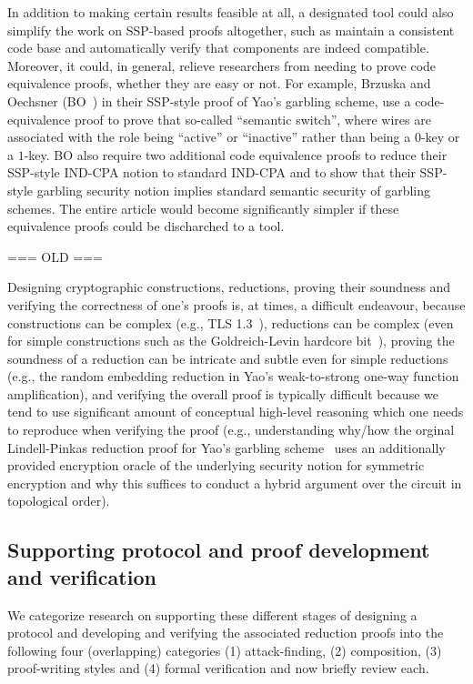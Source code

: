 {In addition to making certain results feasible at all, a designated tool could 
also simplify the work on SSP-based proofs altogether, such as maintain a consistent
code base and automatically verify that components are indeed compatible.
Moreover, it could, in general, relieve researchers from needing to prove
code equivalence proofs, whether they are easy or not. For example, Brzuska
and Oechsner (BO~\cite{X}) in their SSP-style proof of Yao's garbling scheme,
use a code-equivalence proof to prove that so-called ``semantic switch'', where
wires are associated with the role being ``active'' or ``inactive'' rather than
being a $0$-key or a $1$-key. BO also require two additional code equivalence proofs
to reduce their SSP-style IND-CPA notion to standard IND-CPA and to show that their
SSP-style garbling security notion implies standard semantic security of garbling schemes. The entire article would become significantly simpler if these equivalence
proofs could be discharched to a tool.






\iffalse
=== OLD ===

Designing cryptographic constructions, reductions, proving their soundness and verifying the correctness of one's proofs is, at times, a difficult endeavour, because constructions can be complex (e.g., TLS 1.3~\cite{X}), reductions can be complex (even for simple constructions such as the Goldreich-Levin hardcore bit~\cite{X}), proving the soundness of a reduction can be intricate and subtle even for simple reductions (e.g., the random embedding reduction in Yao's weak-to-strong one-way function amplification), and verifying the overall proof is typically difficult because we tend to use significant amount of conceptual high-level reasoning which one needs to reproduce when verifying the proof (e.g., understanding why/how the orginal Lindell-Pinkas reduction proof for Yao's garbling scheme~\cite{X} uses an additionally provided encryption oracle of the underlying security notion for symmetric encryption and why this suffices to conduct a hybrid argument over the circuit in topological order).

\subsection{Supporting protocol and proof development and verification}
We categorize research on supporting these different stages of designing a protocol and developing and verifying the associated reduction proofs into the following four (overlapping) categories (1) attack-finding, (2) composition, (3) proof-writing styles and (4) formal verification and now briefly review each.

}
